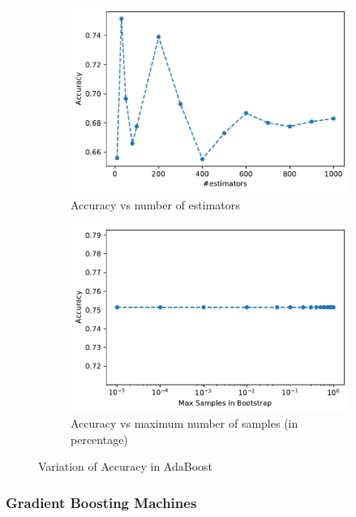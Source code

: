 \documentclass[10pt, a4paper, twocolumn]{article}
\begin{document}
\begin{figure}
    \centering
    \begin{subfigure}[t]{0.49\columnwidth}
    \includegraphics[width=\linewidth]{Ada_accuracy.pdf}
    \caption{Accuracy vs number of estimators}
    \label{fig:ada_accuracy}
\end{subfigure}
  \hfill %
\begin{subfigure}[t]{0.49\columnwidth}
    \includegraphics[width=\linewidth]{Ada_maxsamples.pdf}
    \caption{Accuracy vs maximum number of samples (in percentage)}
    \label{fig:ada_max}
\end{subfigure}
\caption{Variation of Accuracy in AdaBoost}\label{fig:ada_acc}
\end{figure}

\subsubsection*{Gradient Boosting Machines}
\end{document}
